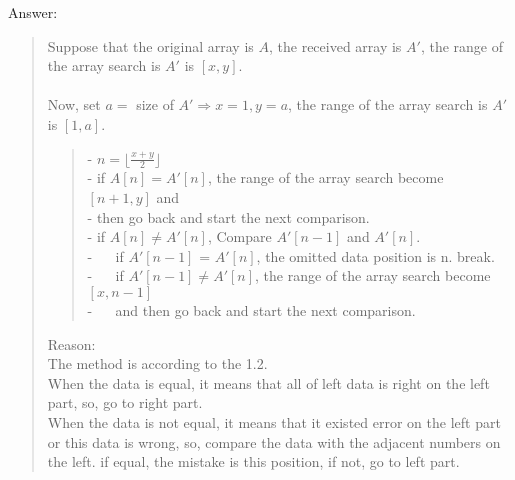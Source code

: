 \documentclass{article}
\begin{document}
\begin{Question}
\begin{Subquestion}
\begin{answer}
Answer:
\begin{quote}
Suppose that the original array is $A$, the received array is $A'$, the range of the array search is $A'$ is $[x, y]$.\\\\
Now, set $a =$ size of $A' \Rightarrow x = 1, y = a$, the range of the array search is $A'$ is $[1, a]$.
\begin{quote}
    - $n = \displaystyle{\lfloor \frac{x + y}{2}  \rfloor} $\\
    - if $A[n] = A'[n]$, the range of the array search become $[n+1, y]$ and\\- then go back and start the next comparison.\\
    - if $A[n] \neq A'[n]$, Compare $A'[n-1]$ and $A'[n]$.\\
    - $\quad$ if $A'[n-1]$ = $A'[n]$, the omitted data position is n. break.\\
    - $\quad$ if $A'[n-1] \neq A'[n]$, the range of the array search become $[x, n-1]$\\- $\quad$ and then go back and start the next comparison. 
\end{quote}
Reason:\\
The method is according to the 1.2.\\
When the data is equal, it means that all of left data is right on the left part, so, go to right part.\\
When the data is not equal, it means that it existed error on the left part or this data is wrong, so, compare the data with the adjacent numbers on the left. if equal, the mistake is this position, if not, go to left part.\\
\end{quote}
\end{answer}
\end{Subquestion}
\end{Question}
\end{document}
